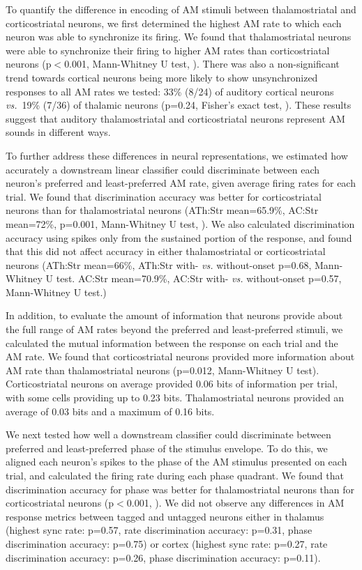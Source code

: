 To quantify the difference in encoding of AM stimuli between thalamostriatal and corticostriatal neurons, we first determined the highest AM rate to which each neuron was able to synchronize its firing.
%
We found that thalamostriatal neurons were able to synchronize their firing to higher AM rates than corticostriatal neurons (p$<$0.001, Mann-Whitney U test, \fig{\AMSync}).
%
There was also a non-significant trend towards cortical neurons being more likely to show unsynchronized responses to all AM rates we tested: 33\% (8/24) of auditory cortical neurons \emph{vs.}\ 19\% (7/36) of thalamic neurons (p=0.24, Fisher’s exact test, \fig{\AMPies}).
%
These results suggest that auditory thalamostriatal and corticostriatal neurons represent AM sounds in different ways.

To further address these differences in neural representations, we estimated how accurately a downstream linear classifier could discriminate between each neuron's preferred and least-preferred AM rate, given average firing rates for each trial.
%
We found that discrimination accuracy was better for corticostriatal neurons than for thalamostriatal neurons (ATh:Str mean=65.9\%, AC:Str mean=72\%, p=0.001, Mann-Whitney U test, \fig{\AMRateDiscrim}).
%
We also calculated discrimination accuracy using spikes only from the sustained portion of the response, and found that this did not affect accuracy in either thalamostriatal or corticostriatal neurons (ATh:Str mean=66\%, ATh:Str with- \emph{vs.} without-onset p=0.68, Mann-Whitney U test. AC:Str mean=70.9\%, AC:Str with- \emph{vs.} without-onset p=0.57, Mann-Whitney U test.)

In addition, to evaluate the amount of information that neurons provide about the full range of AM rates beyond the preferred and least-preferred stimuli, we calculated the mutual information between the response on each trial and the AM rate.
%
We found that corticostriatal neurons provided more information about AM rate than thalamostriatal neurons  (p=0.012, Mann-Whitney U test).
%
Corticostriatal neurons on average provided 0.06 bits of information per trial, with some cells providing up to 0.23 bits. 
%
Thalamostriatal neurons provided an average of 0.03 bits and a maximum of 0.16 bits.
%

We next tested how well a downstream classifier could discriminate between preferred and least-preferred phase of the stimulus envelope.
%
To do this, we aligned each neuron's spikes to the phase of the AM stimulus presented on each trial, and calculated the firing rate during each phase quadrant. 
%
We found that discrimination accuracy for phase was better for thalamostriatal neurons than for corticostriatal neurons (p$<$0.001, \fig{\AMPhaseDiscrim}).
%
We did not observe any differences in AM response metrics between tagged and untagged neurons either in thalamus (highest sync rate: p=0.57, rate discrimination accuracy: p=0.31, phase discrimination accuracy: p=0.75) or cortex (highest sync rate: p=0.27, rate discrimination accuracy: p=0.26, phase discrimination accuracy: p=0.11).

